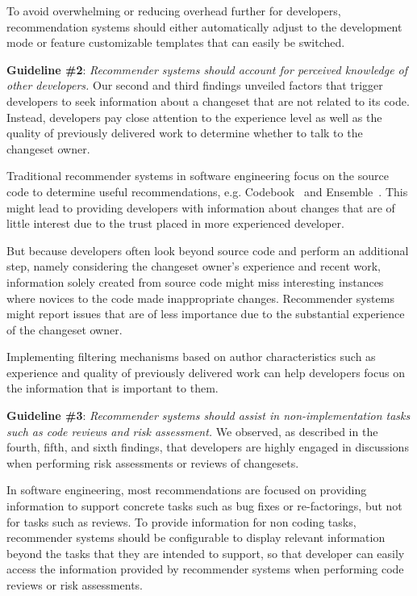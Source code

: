To avoid overwhelming or reducing overhead further for developers, recommendation systems should either automatically adjust to the development mode or feature customizable templates that can easily be switched. 

\textbf{Guideline \#2}: \emph{Recommender systems should account for perceived knowledge of other developers.}
Our second and third findings unveiled factors that trigger developers to seek information about a changeset that are not related to its code. 
Instead, developers pay close attention to the experience level as well as the quality of previously delivered work to determine whether to talk to the changeset owner.

Traditional recommender systems in software engineering focus on the source code to determine useful recommendations, e.g. Codebook~\cite{begel:icse:2010} and Ensemble~\cite{xiang:rsse:2008}.
This might lead to providing developers with information about changes that are of little interest due to the trust placed in more experienced developer. 

But because developers often look beyond source code and perform an additional step, namely considering the changeset owner's experience and recent work, information solely created from source code might miss interesting instances where novices to the code made inappropriate changes.
Recommender systems might report issues that are of less importance due to the substantial experience of the changeset owner.

Implementing filtering mechanisms based on author characteristics such as experience and quality of previously delivered work can help developers focus on the information that is important to them.


\textbf{Guideline \#3}: \emph{Recommender systems should assist in non-implementation tasks such as code reviews and risk assessment.} 
We observed, as described in the fourth, fifth, and sixth findings, that developers are highly engaged in discussions when performing risk assessments or reviews of changesets. 

In software engineering, most recommendations are focused on providing information to support concrete tasks such as bug fixes or re-factorings, but not for tasks such as reviews. To provide information for non coding tasks, recommender systems should be configurable to display relevant information beyond the tasks that they are intended to support, so that developer can easily access the information provided by recommender systems when performing code reviews or risk assessments.

